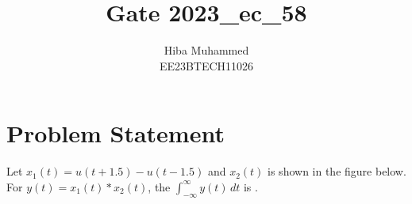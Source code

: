 \documentclass[12pt]{article}
\title{Gate 2023\_ec\_58}
\author{Hiba Muhammed \\
        EE23BTECH11026}
\begin{document}
\maketitle

\section*{Problem Statement}

Let $x_1(t) = u(t + 1.5) - u(t - 1.5)$ and $x_2(t)$ is shown in the figure below. For $y(t) = x_1(t) * x_2(t)$, the $\int_{-\infty}^{\infty} y(t) \, dt$ is \underline{\hspace{2cm}}.
\end{document}
